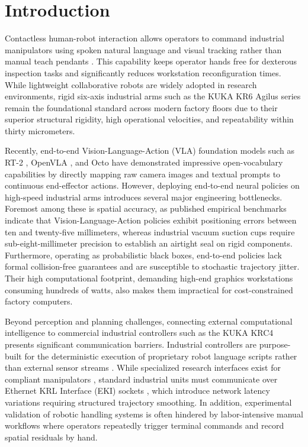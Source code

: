 \documentclass{svproc}
\begin{document}
\section{Introduction}
\label{sec:introduction}

Contactless human-robot interaction allows operators to command industrial manipulators using spoken natural language and visual tracking rather than manual teach pendants \cite{cherubini2016}. This capability keeps operator hands free for dexterous inspection tasks and significantly reduces workstation reconfiguration times. While lightweight collaborative robots are widely adopted in research environments, rigid six-axis industrial arms such as the KUKA KR6 Agilus series remain the foundational standard across modern factory floors due to their superior structural rigidity, high operational velocities, and repeatability within thirty micrometers.

Recently, end-to-end Vision-Language-Action (VLA) foundation models such as RT-2 \cite{rt2_2023}, OpenVLA \cite{openvla2024}, and Octo \cite{octo2024} have demonstrated impressive open-vocabulary capabilities by directly mapping raw camera images and textual prompts to continuous end-effector actions. However, deploying end-to-end neural policies on high-speed industrial arms introduces several major engineering bottlenecks. Foremost among these is spatial accuracy, as published empirical benchmarks indicate that Vision-Language-Action policies exhibit positioning errors between ten and twenty-five millimeters, whereas industrial vacuum suction cups require sub-eight-millimeter precision to establish an airtight seal on rigid components. Furthermore, operating as probabilistic black boxes, end-to-end policies lack formal collision-free guarantees and are susceptible to stochastic trajectory jitter. Their high computational footprint, demanding high-end graphics workstations consuming hundreds of watts, also makes them impractical for cost-constrained factory computers.

Beyond perception and planning challenges, connecting external computational intelligence to commercial industrial controllers such as the KUKA KRC4 \cite{kuka_kss2018} presents significant communication barriers. Industrial controllers are purpose-built for the deterministic execution of proprietary robot language scripts rather than external sensor streams \cite{jopenshowvar2015,villani2018}. While specialized research interfaces exist for compliant manipulators \cite{lbr_stack2024}, standard industrial units must communicate over Ethernet KRL Interface (EKI) sockets \cite{villani2018}, which introduce network latency variations requiring structured trajectory smoothing. In addition, experimental validation of robotic handling systems is often hindered by labor-intensive manual workflows where operators repeatedly trigger terminal commands and record spatial residuals by hand.
\end{document}
